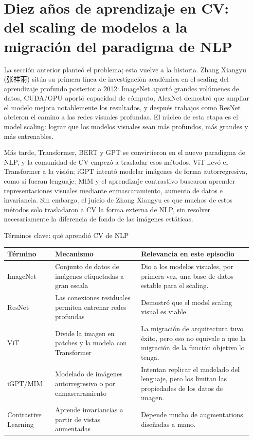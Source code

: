 \section{Diez años de aprendizaje en CV: del scaling de modelos a la migración del paradigma de NLP}

La sección anterior planteó el problema; esta vuelve a la historia. Zhang Xiangyu (张祥雨) sitúa su primera línea de investigación académica en el scaling del aprendizaje profundo posterior a 2012: ImageNet aportó grandes volúmenes de datos, CUDA/GPU aportó capacidad de cómputo, AlexNet demostró que ampliar el modelo mejora notablemente los resultados, y después trabajos como ResNet abrieron el camino a las redes visuales profundas. El núcleo de esta etapa es el model scaling: lograr que los modelos visuales sean más profundos, más grandes y más entrenables.

Más tarde, Transformer, BERT y GPT se convirtieron en el nuevo paradigma de NLP, y la comunidad de CV empezó a trasladar esos métodos. ViT llevó el Transformer a la visión; iGPT intentó modelar imágenes de forma autorregresiva, como si fueran lenguaje; MIM y el aprendizaje contrastivo buscaron aprender representaciones visuales mediante enmascaramiento, aumento de datos e invariancia. Sin embargo, el juicio de Zhang Xiangyu es que muchos de estos métodos solo trasladaron a CV la forma externa de NLP, sin resolver necesariamente la diferencia de fondo de las imágenes estáticas.

\begin{knowledgebox}{Términos clave: qué aprendió CV de NLP}
\noindent\begin{tabularx}{\textwidth}{p{}p{}X}
\toprule
Término & Mecanismo & Relevancia en este episodio \\
\midrule
ImageNet & Conjunto de datos de imágenes etiquetadas a gran escala & Dio a los modelos visuales, por primera vez, una base de datos estable para el scaling. \\
ResNet & Las conexiones residuales permiten entrenar redes profundas & Demostró que el model scaling visual es viable. \\
ViT & Divide la imagen en patches y la modela con Transformer & La migración de arquitectura tuvo éxito, pero eso no equivale a que la migración de la función objetivo lo tenga. \\
iGPT/MIM & Modelado de imágenes autorregresivo o por enmascaramiento & Intentan replicar el modelado del lenguaje, pero los limitan las propiedades de los datos de imagen. \\
Contrastive Learning & Aprende invariancias a partir de vistas aumentadas & Depende mucho de augmentations diseñadas a mano. \\
\bottomrule
\end{tabularx}
\end{knowledgebox}


